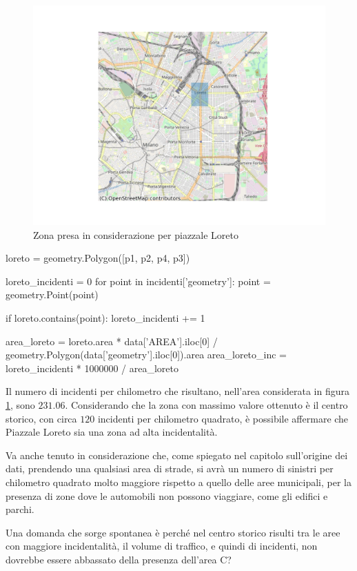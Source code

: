 \documentclass[a4paper,12pt]{report}
\begin{document}
\begin{figure}
    \hfill\includegraphics[width=0.7\linewidth]{../src/municipi_milano/zona_loreto.png}\hspace*{\fill}
    \caption{Zona presa in considerazione per piazzale Loreto}
    \label{fig:zona-loreto}
\end{figure}

\begin{code}
loreto = geometry.Polygon([p1, p2, p4, p3])

loreto_incidenti = 0
for point in incidenti['geometry']: 
    point = geometry.Point(point)

    if loreto.contains(point): 
        loreto_incidenti += 1

area_loreto = loreto.area * data['AREA'].iloc[0] / geometry.Polygon(data['geometry'].iloc[0]).area
area_loreto_inc = loreto_incidenti * 1000000 / area_loreto
\end{code}

Il numero di incidenti per chilometro che risultano, nell'area considerata in figura 
\ref{fig:zona-loreto}, sono $231.06$. 
Considerando che la zona con massimo valore ottenuto è il centro storico, 
con circa $120$ incidenti per chilometro quadrato, è possibile affermare 
che Piazzale Loreto sia una zona ad alta incidentalità.

Va anche tenuto in considerazione che, come spiegato nel capitolo sull'origine dei dati, 
prendendo una qualsiasi area di strade, si avrà un numero di sinistri per chilometro quadrato 
molto maggiore rispetto a quello delle aree municipali, per la presenza di zone dove  
le automobili non possono viaggiare, come gli edifici e parchi.

Una domanda che sorge spontanea è perché nel centro storico risulti tra le aree con maggiore 
incidentalità, il volume di traffico, e quindi di incidenti, non dovrebbe essere abbassato 
della presenza dell'area C?
\end{document}
